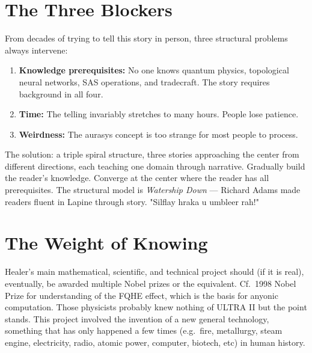\section*{The Three Blockers}
\label{pos23:the-three-blockers}


From decades of trying to tell this story in person, three structural problems always intervene:

\begin{enumerate}
\item \textbf{Knowledge prerequisites:} No one knows quantum physics, topological neural networks, SAS operations, and tradecraft. The story requires background in all four.
\item \textbf{Time:} The telling invariably stretches to many hours. People lose patience.
\item \textbf{Weirdness:} The \gls{aurasys} concept is too strange for most people to process.
\end{enumerate}

The solution: a triple spiral structure, three stories approaching the center from different directions, each teaching one domain through narrative. Gradually build the reader's knowledge. Converge at the center where the reader has all prerequisites. The structural model is \textit{Watership Down} --- Richard Adams made readers fluent in Lapine through story. "Silflay hraka u umbleer rah!"

\section*{The Weight of Knowing}
\label{pos23:the-weight-of-knowing}


Healer's main mathematical, scientific, and technical project should (if it is real), eventually, be awarded multiple Nobel prizes or the equivalent.  Cf.\ 1998 Nobel Prize for understanding of the FQHE effect, which is the basis for anyonic computation. Those physicists probably knew nothing of ULTRA II but the point stands.  This project involved the invention of a new general technology, something that has only happened a few times (e.g.\ fire, metallurgy, steam engine, electricity, radio, atomic power, computer, biotech, etc) in human history.


